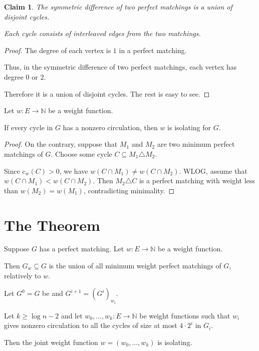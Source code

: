 \documentclass{beamer}
\newtheorem{claim}{Claim}
\theoremstyle{remark}
\newcommand{\nn}{\mathbb{N}}
\newcommand{\cl}{\text{c}}
\begin{document}
\begin{frame}
  \begin{claim}
    The symmetric difference of two perfect matchings is a union of
    disjoint cycles.

    Each cycle consists of interleaved edges from the two matchings.
  \end{claim}

  \begin{proof}
    The degree of each vertex is $1$ in a perfect matching.

    Thus, in the symmetric difference of two perfect matchings, each
    vertex has degree $0$ or $2$.

    Therefore it is a union of disjoint cycles. The rest is easy to see.
  \end{proof}
\end{frame}
\begin{frame}
  \begin{lemma}
    Let $w : E \to \nn$ be a weight function.

    If every cycle in $G$ has a nonzero circulation, then $w$ is
    isolating for $G$.
  \end{lemma}

  \begin{proof}
    On the contrary, suppose that $M_1$ and $M_2$ are two minimum
    perfect matchings of $G$.
    Choose some cycle $C \subseteq M_1 \triangle M_2$.

    Since $\cl_w(C) > 0$, we have $w(C \cap M_1) \ne w(C \cap M_2)$.
    WLOG, assume that $w(C \cap M_1) < w(C \cap M_2)$.
    Then $M_2 \triangle C$ is a perfect matching with weight less than
    $w(M_2) = w(M_1)$,
    contradicting minimality.
  \end{proof}
\end{frame}

\section{The Theorem}

\begin{frame}
  \begin{definition}
    Suppose $G$ has a perfect matching. Let $w : E \to \nn$ be a weight function.

    Then $G_w \subseteq G$ is the union of all minimum weight
    perfect matchings of $G$, relatively to $w$.
  \end{definition}

  \begin{theorem}
    Let $G^0 = G$ be and $G^{i+1} = {\left(G^{i}\right)}_{w_i}$.

    Let $k \ge \log n - 2$ and let $w_0, \ldots, w_k : E \to \nn$ be weight functions
    such that $w_i$ gives nonzero circulation to all the
    cycles of size at most $4 \cdot 2^i$ in $G_{i}$.

    Then the joint weight function $w = (w_0, \ldots, w_k)$ is isolating.
  \end{theorem}
\end{frame}
\end{document}
